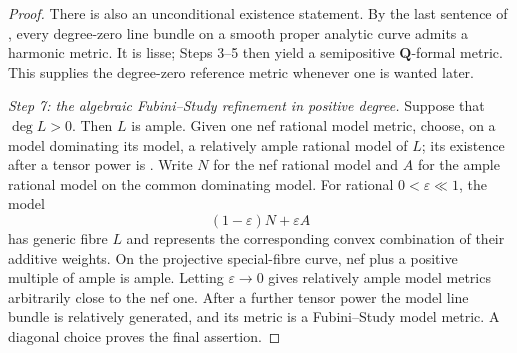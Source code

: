 \begin{proof}
There is also an unconditional existence statement. By the last sentence
of \cite[Rem.~3.4.20]{Thu05}, every degree-zero line bundle on a smooth
proper analytic curve admits a harmonic metric. It is lisse; Steps 3--5
then yield a semipositive \(\mathbf Q\)-formal metric. This supplies the
degree-zero reference metric whenever one is wanted later.

\emph{Step 7: the algebraic Fubini--Study refinement in positive degree.}
Suppose that \(\deg L>0\). Then \(L\) is
ample. Given one nef rational model metric,
choose, on a model dominating its model, a relatively ample rational model
of \(L\); its existence after a tensor power is
\cite[Prop.~4.11]{GM19}. Write \(N\) for the nef rational model and \(A\)
for the ample rational model on the common dominating model. For rational
\(0<\varepsilon\ll1\), the model
\[
                         (1-\varepsilon)N+\varepsilon A
\]
has generic fibre \(L\) and represents the corresponding convex
combination of their additive weights. On the
projective special-fibre curve, nef plus a positive multiple of ample is
ample. Letting \(\varepsilon\to0\) gives relatively ample model metrics
arbitrarily close to the nef one. After a further tensor power the model
line bundle is relatively generated, and its metric is a Fubini--Study
model metric. A diagonal choice proves the final assertion.
\end{proof}

